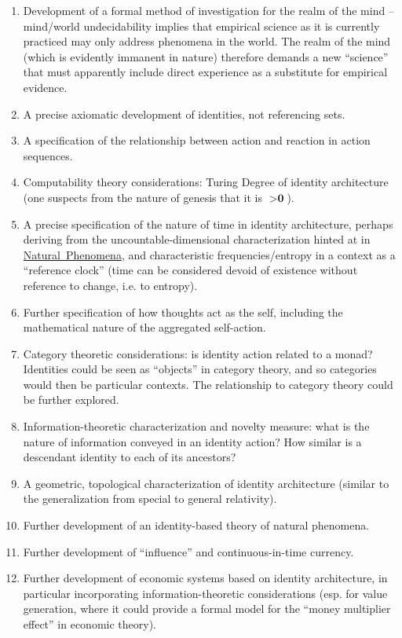 \documentclass[pra,twocolumn,groupedaddress,10pt]{revtex4}
\theoremstyle{definition}
\begin{document}
\begin{enumerate}
	\item Development of a formal method of investigation for the realm of the mind -- mind/world undecidability implies that empirical science as it is currently practiced may only address phenomena in the world. The realm of the mind (which is evidently immanent in nature) therefore demands a new ``science'' that must apparently include direct experience as a substitute for empirical evidence.
	\item A precise axiomatic development of identities, not referencing sets.
	\item A specification of the relationship between action and reaction in action sequences.
	\item Computability theory considerations: Turing Degree of identity architecture (one suspects from the nature of genesis that it is $> \textbf{0}$).
	\item A precise specification of the nature of time in identity architecture, perhaps deriving from the uncountable-dimensional characterization hinted at in \hyperref[sec:natphe]{Natural~Phenomena}, and characteristic frequencies/entropy in a context as a ``reference clock'' (time can be considered devoid of existence without reference to change, i.e. to entropy).
	\item Further specification of how thoughts act as the self, including the mathematical nature of the aggregated self-action.
	\item Category theoretic considerations: is identity action related to a monad? Identities could be seen as ``objects'' in category theory, and so categories would then be particular contexts. The relationship to category theory could be further explored.
	\item Information-theoretic characterization and novelty measure: what is the nature of information conveyed in an identity action? How similar is a descendant identity to each of its ancestors?
	\item A geometric, topological characterization of identity architecture (similar to the generalization from special to general relativity).
	\item Further development of an identity-based theory of natural phenomena.
	\item Further development of ``influence'' and continuous-in-time currency.
	\item Further development of economic systems based on identity architecture, in particular incorporating information-theoretic considerations (esp. for value generation, where it could provide a formal model for the ``money multiplier effect'' in economic theory).

\end{enumerate}
\end{document}
